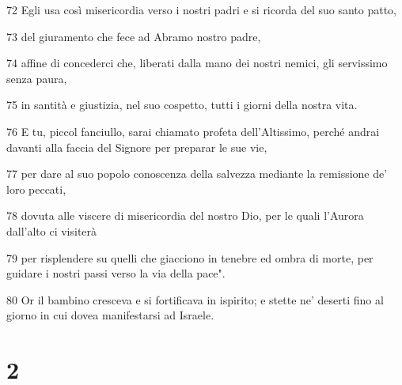 \par 72 Egli usa così misericordia verso i nostri padri e si ricorda del suo santo patto,
\par 73 del giuramento che fece ad Abramo nostro padre,
\par 74 affine di concederci che, liberati dalla mano dei nostri nemici, gli servissimo senza paura,
\par 75 in santità e giustizia, nel suo cospetto, tutti i giorni della nostra vita.
\par 76 E tu, piccol fanciullo, sarai chiamato profeta dell'Altissimo, perché andrai davanti alla faccia del Signore per preparar le sue vie,
\par 77 per dare al suo popolo conoscenza della salvezza mediante la remissione de' loro peccati,
\par 78 dovuta alle viscere di misericordia del nostro Dio, per le quali l'Aurora dall'alto ci visiterà
\par 79 per risplendere su quelli che giacciono in tenebre ed ombra di morte, per guidare i nostri passi verso la via della pace".
\par 80 Or il bambino cresceva e si fortificava in ispirito; e stette ne' deserti fino al giorno in cui dovea manifestarsi ad Israele.

\chapter{2}

